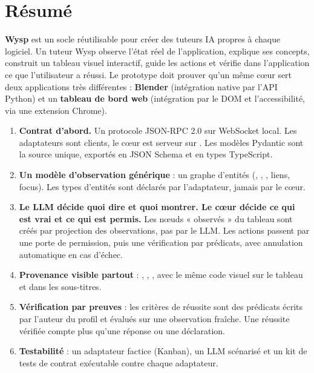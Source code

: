 \section{Résumé}

\textbf{Wysp} est un socle réutilisable pour créer des tuteurs IA propres à chaque logiciel. Un tuteur Wysp observe l'état réel de l'application, explique ses concepts, construit un tableau visuel interactif, guide les actions et vérifie dans l'application ce que l'utilisateur a réussi. Le prototype doit prouver qu'un même cœur sert deux applications très différentes : \textbf{Blender} (intégration native par l'API Python) et un \textbf{tableau de bord web} (intégration par le DOM et l'accessibilité, via une extension Chrome).

\begin{keybox}
\begin{enumerate}[leftmargin=1.2em]
  \item \textbf{Contrat d'abord.} Un protocole JSON-RPC 2.0 sur WebSocket local. Les adaptateurs sont clients, le cœur est serveur sur . Les modèles Pydantic sont la source unique, exportés en JSON Schema et en types TypeScript.
  \item \textbf{Un modèle d'observation générique} : un graphe d'entités (, , , liens, focus). Les types d'entités sont déclarés par l'adaptateur, jamais par le cœur.
  \item \textbf{Le LLM décide quoi dire et quoi montrer. Le cœur décide ce qui est vrai et ce qui est permis.} Les nœuds « observés » du tableau sont créés par projection des observations, pas par le LLM. Les actions passent par une porte de permission, puis une vérification par prédicats, avec annulation automatique en cas d'échec.
  \item \textbf{Provenance visible partout} : \pobs, \pinf, \pill, avec le même code visuel sur le tableau et dans les sous-titres.
  \item \textbf{Vérification par preuves} : les critères de réussite sont des prédicats écrits par l'auteur du profil et évalués sur une observation fraîche. Une réussite vérifiée compte plus qu'une réponse ou une déclaration.
  \item \textbf{Testabilité} : un adaptateur factice (Kanban), un LLM scénarisé et un kit de tests de contrat exécutable contre chaque adaptateur.
\end{enumerate}
\end{keybox}

